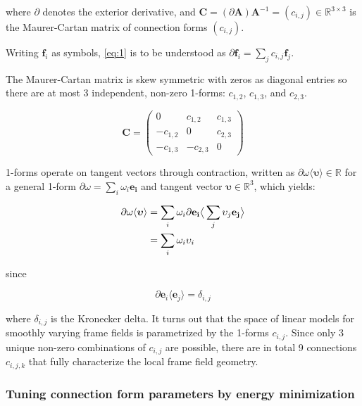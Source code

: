 where $\partial$ denotes the exterior derivative, and $\mathbf{C} = (\partial \mathbf{A}) \mathbf{A}^{-1} = (c_{i,j}) \in \mathbb{R}^{3 \times 3}$ is the Maurer-Cartan matrix of connection forms $(c_{i,j})$.

Writing $\mathbf{f}_i$ as symbols, \ref{eq:1} is to be understood as $\partial \mathbf{f}_i = \sum_j{c_{i,j}\mathbf{f}_j}$.

The Maurer-Cartan matrix is skew symmetric with zeros as diagonal entries so there are at most 3 independent, non-zero 1-forms: $c_{1,2}$, $c_{1,3}$, and $c_{2,3}$.

\begin{equation}
    \mathbf{C} = \begin{pmatrix}
    0 & c_{1,2} & c_{1,3} \\
    -c_{1,2} & 0 & c_{2,3} \\
    -c_{1,3} & -c_{2,3} & 0
    \end{pmatrix}
\end{equation}

1-forms operate on tangent vectors through contraction, written as $\partial \omega \langle \boldsymbol{\upsilon} \rangle \in \mathbb{R}$ for a general 1-form $\partial \omega = \sum_i{\omega_i \mathbf{e_i}}$ and tangent vector $\boldsymbol{\upsilon} \in \mathbb{R}^3$, which yields:

\begin{align}
    \partial \omega \langle \boldsymbol{\upsilon} \rangle &= \sum_i{\omega_i \partial \mathbf{e_i}} \big{\langle} \sum_j{\upsilon_j \mathbf{e_j}} \big{\rangle} \\
    &= \sum_i{\omega_i \upsilon_i}
\end{align}

since

\begin{equation}
    \partial \mathbf{e}_i \langle \mathbf{e}_j \rangle = \delta_{i,j}
\end{equation}

where $\delta_{i,j}$ is the Kronecker delta.
It turns out that the space of linear models for smoothly varying frame fields is parametrized by the 1-forms $c_{i,j}$. Since only 3 unique non-zero combinations of $c_{i,j}$ are possible, there are in total 9 connections $c_{i,j,k}$ that fully characterize the local frame field geometry.

\subsubsection{Tuning connection form parameters by energy minimization} \label{fitting_method}

